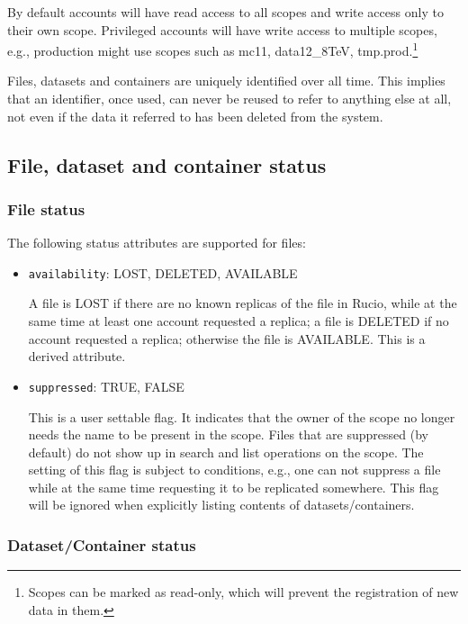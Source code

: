 \documentclass{atlasnote}
\begin{document}
By default accounts will have read access to all scopes and write access only to their own scope. Privileged accounts will have write access to multiple scopes, e.g., production might use scopes such as mc11, data12\_8TeV, tmp.prod.\footnote{Scopes can be marked as read-only, which will prevent the registration of new data in them.}

Files, datasets and containers are uniquely identified over all time. This implies that an identifier, once used, can never be reused to refer to anything else at all, not even if the data it referred to has been deleted from the system.

\subsection{File, dataset and container status}

\subsubsection{File status}
\label{sec:file-status}

The following status attributes are supported for files:

\begin{itemize}
\item{} \texttt{availability}: LOST, DELETED, AVAILABLE

A file is LOST if there are no known replicas of the file in Rucio, while at the same time at least one account requested a replica; a file is DELETED if no account requested a replica; otherwise the file is AVAILABLE. This is a derived attribute.

\item{} \texttt{suppressed}: TRUE, FALSE

This is a user settable flag. It indicates that the owner of the scope no longer needs the name to be present in the scope. Files that are suppressed (by default) do not show up in search and list operations on the scope. The setting of this flag is subject to conditions, e.g., one can not suppress a file while at the same time requesting it to be replicated somewhere. This flag will be ignored when explicitly listing contents of datasets/containers.
\end{itemize}

\subsubsection{Dataset/Container status}
\label{sec:dataset-container-status}
\end{document}
